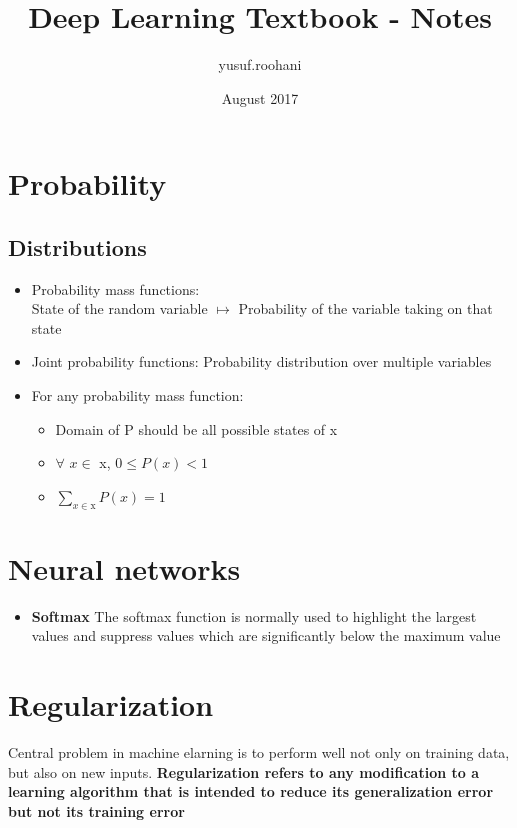 \documentclass{article}
\title{Deep Learning Textbook - Notes}
\author{yusuf.roohani }
\date{August 2017}
\begin{document}
\maketitle


\section{Probability}

\subsection{Distributions}

\begin{itemize}
    \item Probability mass functions:\\
    State of the random variable $\mapsto$ Probability of the variable taking on that state
    
    \item Joint probability functions:
    Probability distribution over multiple variables
    
    \item 
    For any probability mass function:
    \begin{itemize}
    \item Domain of P should be all possible states of x
    \item $\forall$ $x \in$ x, $ 0 \leq P(x) < 1$
    \item $\sum_{x \in \textrm{x}} P(x) = 1$
    \end{itemize}
\end{itemize}

\section{Neural networks}

\begin{itemize}
    \item \textbf{Softmax} The softmax function is normally used to highlight the largest values and suppress values which are significantly below the maximum value
\end{itemize}

\section{Regularization}
Central problem in machine elarning is to perform well not only on training data, but also on new inputs. \textbf{Regularization refers to any modification to a learning algorithm that is intended to reduce its generalization error but not its training error}
\end{document}
